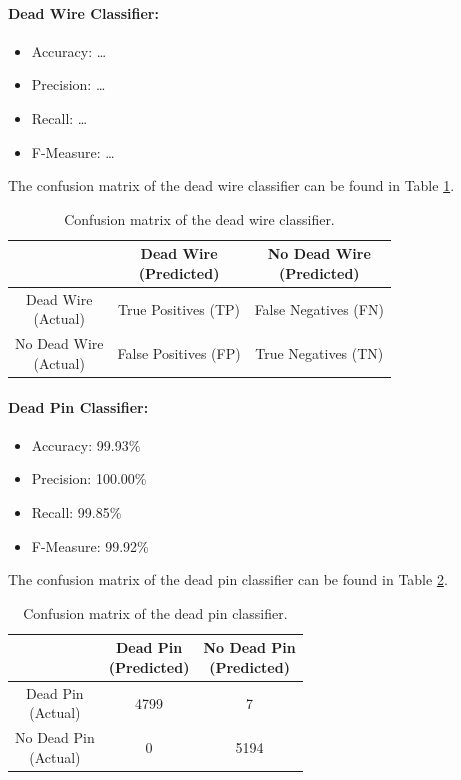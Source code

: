 \paragraph{Dead Wire Classifier:}
\begin{itemize}
  \item Accuracy: \ldots
  \item Precision: \ldots
  \item Recall: \ldots
  \item F-Measure: \ldots
\end{itemize}
The confusion matrix of the dead wire classifier can be found in Table
\ref{tbl:confusion-deadwire}.
\begin{table}[h]
  \centering
  \renewcommand\theadfont{\bfseries}
  \begin{tabular}{|c|c|c|}
    \hline
    & \thead{Dead Wire\\(Predicted)} & \thead{No Dead Wire\\(Predicted)} \\
    \hline
    \thead{Dead Wire\\(Actual)} & True Positives (TP) & False
    Negatives (FN) \\
    \hline
    \thead{No Dead Wire\\(Actual)} & False Positives (FP) & True
    Negatives (TN) \\
    \hline
  \end{tabular}
  \caption{Confusion matrix of the dead wire classifier.}
  \label{tbl:confusion-deadwire}
\end{table}

\paragraph{Dead Pin Classifier:}
\begin{itemize}
  \item Accuracy: 99.93\%
  \item Precision: 100.00\%
  \item Recall: 99.85\%
  \item F-Measure: 99.92\%
\end{itemize}
The confusion matrix of the dead pin classifier can be found in Table
\ref{tbl:confusion-pin}.
\begin{table}[h]
  \centering
  \renewcommand\theadfont{\bfseries}
  \begin{tabular}{|c|c|c|}
    \hline
    & \thead{Dead Pin\\(Predicted)} & \thead{No Dead Pin\\(Predicted)} \\
    \hline
    \thead{Dead Pin\\(Actual)} & 4799 & 7\\
    \hline
    \thead{No Dead Pin\\(Actual)} & 0 & 5194\\
    \hline
  \end{tabular}
  \caption{Confusion matrix of the dead pin classifier.}
  \label{tbl:confusion-pin}
\end{table}

